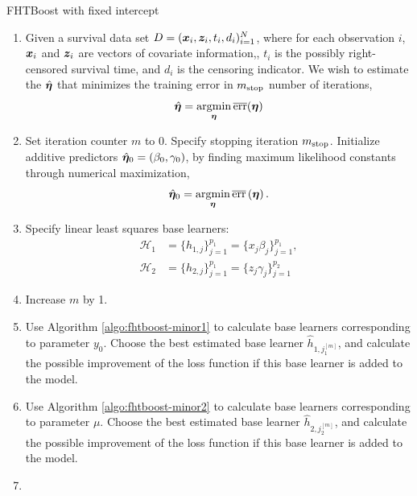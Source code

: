 \begin{algorithm}
\caption{FHTBoost with fixed intercept}
\label{algo:fhtboost}
\begin{enumerate}
    \item
        Given a survival data set $D=(\bm{x}_i, \bm{z}_i, t_i,d_i)_{i=1}^N$, where for each observation $i$,
        $\bm{x}_i$ and $\bm{z}_i$ are vectors of covariate information,, $t_i$ is the possibly right-censored survival time, and $d_i$ is the censoring indicator.
        We wish to estimate the $\hat{\boldsymbol{\eta}}$ that minimizes the training error in $m_{\text{stop}}$ number of iterations,
        \begin{equation*}
            \hat{\boldsymbol{\eta}}=\operatorname*{argmin}_{\boldsymbol{\eta}}\overline{\text{err}}(\boldsymbol{\eta})
        \end{equation*}
    \item
        Set iteration counter $m$ to $0$.
        Specify stopping iteration $m_{\text{stop}}$.
        Initialize additive predictors $\hat{\boldsymbol{\eta}}_0=\left(\beta_{0},\gamma_{0}\right)$, by finding maximum likelihood constants through numerical maximization,
        \begin{equation*}
            \hat{\boldsymbol{\eta}}_0=\operatorname*{argmin}_{\boldsymbol{\eta}}\overline{\text{err}}\left(\boldsymbol{\eta}\right).
        \end{equation*}
    \item
    \label{algostep:FHT-base-learner}
        Specify linear least squares base learners:
        \begin{align*}
            \mathcal{H}_1&=\{h_{1,j}\}_{j=1}^{p_1}=\{x_j\beta_j\}_{j=1}^{p_1}, \\
            \mathcal{H}_2&=\{h_{2,j}\}_{j=1}^{p_1}=\{z_j\gamma_j\}_{j=1}^{p_2}
        \end{align*}
    \item
    \label{algostep:FHT-init}
        Increase $m$ by 1.
    \item
        Use Algorithm \ref{algo:fhtboost-minor1} to
        calculate base learners corresponding to parameter $y_0$.
        Choose the best estimated base learner $\hat{h}_{1,j_1^{[m]}}$, and calculate the possible improvement of the loss function if this base learner is added to the model.
    \item
        Use Algorithm \ref{algo:fhtboost-minor2} to
        calculate base learners corresponding to parameter $\mu$.
        Choose the best estimated base learner $\hat{h}_{2,j_2^{[m]}}$, and calculate the possible improvement of the loss function if this base learner is added to the model.
    \item

\end{enumerate}
\end{algorithm}

